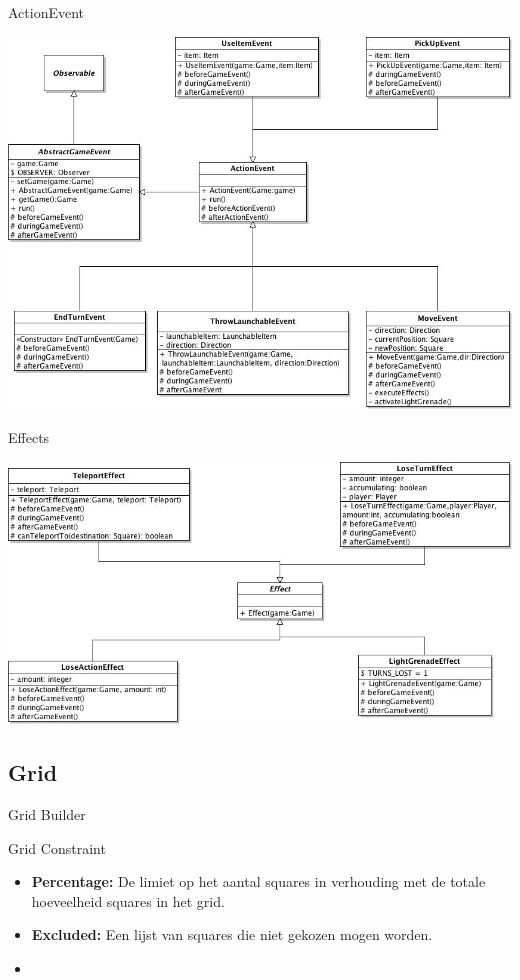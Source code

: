 \documentclass[t]{beamer}
\begin{document}
\begin{frame}{ActionEvent}
\begin{center}
\includegraphics[width=0.65\linewidth]{images/ActionEvents}
\end{center}
\end{frame}

\begin{frame}{Effects}
\begin{center}
\includegraphics[width=0.75\linewidth]{images/Effects}
\end{center}
\end{frame}

\subsection{Grid}
\begin{frame}{Grid Builder}
\end{frame}

\begin{frame}{Grid Constraint}
\begin{itemize}
	\item \textbf{Percentage:} De limiet op het aantal squares in verhouding met de totale hoeveelheid squares in het grid.
	\item \textbf{Excluded:} Een lijst van squares die niet gekozen mogen worden.
	\item 
\end{itemize}
\end{frame}
\end{document}
